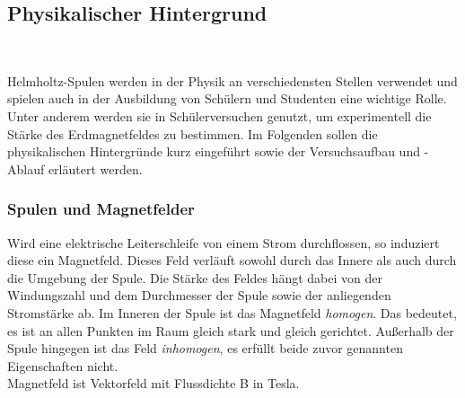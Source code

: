 \subsection{Physikalischer Hintergrund}
\begin{center}
	\\
\end{center}


Helmholtz-Spulen werden in der Physik an verschiedensten Stellen verwendet und spielen auch in der Ausbildung von Schülern und Studenten eine wichtige Rolle. Unter anderem werden sie in Schülerversuchen genutzt, um experimentell die Stärke des Erdmagnetfeldes zu bestimmen. Im Folgenden sollen die physikalischen Hintergründe kurz eingeführt sowie der Versuchsaufbau und -Ablauf erläutert werden.

\subsubsection{Spulen und Magnetfelder}
Wird eine elektrische Leiterschleife von einem Strom durchflossen, so induziert diese ein Magnetfeld. Dieses Feld verläuft sowohl durch das Innere als auch durch die Umgebung der Spule. Die Stärke des Feldes hängt dabei von der Windungszahl und dem Durchmesser der Spule sowie der anliegenden Stromstärke ab.
Im Inneren der Spule ist das Magnetfeld \textit{homogen}. Das bedeutet, es ist an allen Punkten im Raum gleich stark und gleich gerichtet. Außerhalb der Spule hingegen ist das Feld \textit{inhomogen}, es erfüllt beide zuvor genannten Eigenschaften nicht.\\

Magnetfeld ist Vektorfeld mit Flussdichte B in Tesla.\\

